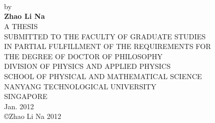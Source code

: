 \begin{titlepage}
\begin{center}
 \\
\vspace*{0.3cm}
 \\

\vspace*{1.8cm}
 \\
\vspace*{1.5cm}
\noindent \large by \\
\vspace*{1.8cm}
\noindent \large \textbf{Zhao Li Na} \\
\vspace*{2.2cm}
    A THESIS \\
\vspace*{0.4cm}
SUBMITTED TO THE FACULTY OF GRADUATE STUDIES\\
\vspace*{0.4cm}
IN PARTIAL FULFILLMENT OF THE REQUIREMENTS FOR\\ 
\vspace*{0.4cm}
THE DEGREE OF DOCTOR OF PHILOSOPHY\\
\vspace*{1.0cm}
DIVISION OF PHYSICS AND APPLIED PHYSICS\\
\vspace*{0.4cm}
SCHOOL OF PHYSICAL AND MATHEMATICAL SCIENCE \\
\vspace*{0.4cm}
NANYANG TECHNOLOGICAL UNIVERSITY\\
\vspace*{0.4cm}
SINGAPORE \\
\vspace*{0.8cm}
Jan. 2012 \\
\vspace*{0.8cm}
\copyright Zhao Li Na 2012
\end{center}

\end{titlepage}
\sloppy

\titlepage

